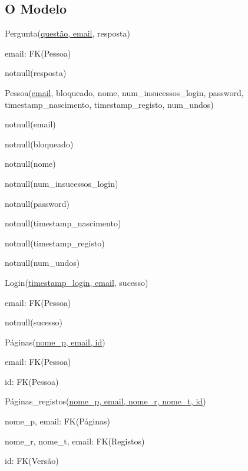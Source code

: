 \documentclass[11pt,a4paper]{article}
\begin{document}
\subsection{O Modelo}

\begin{description}[noitemsep]
	\item Pergunta(\underline{quest\~ao, email}, resposta)
	\item email: FK(Pessoa)
	\item notnull(resposta)
\end{description}

\begin{description}[noitemsep]
	\item Pessoa(\underline{email}, bloqueado, nome, num\_insucessos\_login, password, timestamp\_nascimento, timestamp\_registo, num\_undos)
	\item notnull(email)
	\item notnull(bloqueado)
	\item notnull(nome)
	\item notnull(num\_insucessos\_login)
	\item notnull(password)
	\item notnull(timestamp\_nascimento)
	\item notnull(timestamp\_registo)
	\item notnull(num\_undos)
\end{description}

\begin{description}[noitemsep]
	\item Login(\underline{timestamp\_login, email}, sucesso)
	\item email: FK(Pessoa)
	\item notnull(sucesso)
\end{description}

\begin{description}[noitemsep]
	\item P\'{a}ginas(\underline{nome\_p, email, id})
	\item email: FK(Pessoa)
	\item id: FK(Pessoa)
\end{description}

\begin{description}[noitemsep]
	\item P\'{a}ginas\_registos(\underline{nome\_p, email, nome\_r, nome\_t, id})
	\item nome\_p, email: FK(P\'{a}ginas)
	\item nome\_r, nome\_t, email: FK(Registos)
	\item id: FK(Vers\~{a}o)
\end{description}
\end{document}
